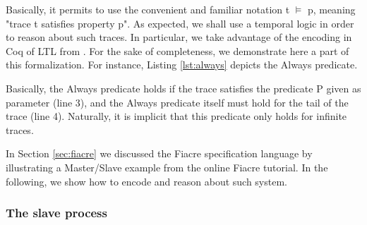						


	\noindent Basically, it permits to use the convenient and familiar notation \textsf{t $\vDash$ p}, meaning
	"trace \textsf{t} satisfies property \textsf{p}". As expected, we shall use a temporal logic in order to reason 
	about such traces. In particular, we take advantage of the encoding in Coq of \ac{LTL} from
	\cite[sec. 13.9]{opac-b1101046}. For the sake of completeness, we demonstrate here a part of 
	this formalization. For instance, Listing \ref{lst:always} depicts the \textsf{Always} predicate.
	




  	
	
	\noindent Basically, the \textsf{Always} predicate holds if the trace  
	satisfies the predicate \textsf{P} given as parameter (line 3), and the \textsf{Always} predicate
	itself must hold for the tail of the trace (line 4). Naturally, it is implicit that this 
	predicate only holds for infinite traces.

	In Section \ref{sec:fiacre} we discussed the Fiacre specification language by illustrating a 
	Master/Slave example from the online Fiacre tutorial. In the following, we show how to encode
	and reason about such system.
	
	
\subsubsection{The slave process}	
\label{subsub:slave}
	
